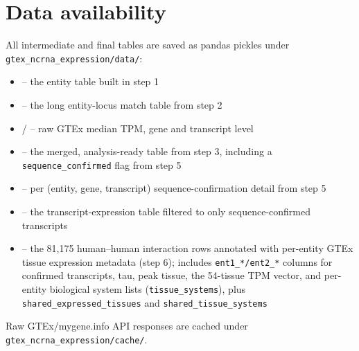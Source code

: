 \documentclass[11pt]{article}
\begin{document}
\section{Data availability}
\begin{sloppypar}
All intermediate and final tables are saved as pandas pickles under
\texttt{gtex\_ncrna\_expression/data/}:
\begin{itemize}
  \item {} -- the entity table built in step 1
  \item {} -- the long entity-locus match table from step 2
  \item {} /  -- raw GTEx median TPM, gene and transcript level
  \item {} -- the merged, analysis-ready table from step 3, including a \texttt{sequence\_confirmed} flag from step 5
  \item {} -- per (entity, gene, transcript) sequence-confirmation detail from step 5
  \item {} -- the transcript-expression table filtered to only sequence-confirmed transcripts
  \item {} -- the 81,175 human--human interaction rows annotated with per-entity GTEx tissue expression metadata (step 6); includes \texttt{ent1\_*/ent2\_*} columns for confirmed transcripts, tau, peak tissue, the 54-tissue TPM vector, and per-entity biological system lists (\texttt{tissue\_systems}), plus \texttt{shared\_expressed\_tissues} and \texttt{shared\_tissue\_systems}
\end{itemize}
Raw GTEx/mygene.info API responses are cached under \texttt{gtex\_ncrna\_expression/cache/}.
\end{sloppypar}
\end{document}

